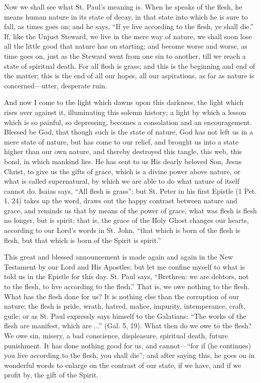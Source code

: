 Now we shall see what St. Paul's meaning is. When
he speaks of the flesh, he means human nature in its state of decay,
in that state into which he is sure to fall, as times goes on; and he
says, ``If ye live according to the flesh, ye shall die.'' If, like
the Unjust Steward, we live in the mere way of nature, we shall soon
lose all the little good that nature has on starting; and become worse
and worse, as time goes on, just as the Steward went from one sin to
another, till we reach a state of spiritual death. For all flesh is
grass; and this is the beginning and end of the matter; this is the
end of all our hopes, all our aspirations, as far as nature is
concerned—utter, desperate ruin.

And now I come to the light which dawns upon this
darkness, the light which rises over against it, illuminating this
solemn history; a light by which a lesson which is so painful, so
depressing, becomes a consolation and an encouragement. Blessed be
God, that though such is the state of nature, God has not left us in a
mere state of nature, but has come to our relief, and brought us into
a state higher than our own nature, and thereby destroyed this tangle,
this web, this bond, in which mankind lies. He has sent to us His
dearly beloved Son, Jesus Christ, to give us the gifts of grace, which
is a divine power above nature, or what is called supernatural, by
which we are able to do what nature of itself cannot do. Isaias
says, ``All flesh is grass''; but St. Peter in his first Epistle (1 Pet.
1, 24) takes up the word, draws out the happy contrast between nature
and grace, and reminds us that by means of the power of grace, what
was flesh is flesh no longer, but is spirit; that is, the grace of the
Holy Ghost changes our hearts, according to our Lord's words in St.
John, ``that which is born of the flesh is flesh, but that which is
born of the Spirit is spirit.''

This great and blessed announcement is made again
and again in the New Testament by our Lord and His Apostles; but let
me confine myself to what is told us in the Epistle for this day. St.
Paul says, ``Brethren: we are debtors, not to the flesh, to live
according to the flesh.'' That is, we owe nothing to the flesh. What
has the flesh done for us? It is nothing else than the corruption of
our nature; the flesh is pride, wrath, hatred, malice, impurity,
intemperance, craft, guile; or as St. Paul expressly says himself to
the Galatians: ``The works of the flesh are manifest, which are ...''
(Gal. 5, 19). What then do we owe to the flesh? We owe sin, misery, a
bad conscience, displeasure, spiritual death, future punishment. It
has done nothing good for us, and cannot—``for if (he continues) you
live according to the flesh, you shall die''; and after saying this, he
goes on in wonderful words to enlarge on the contrast of our state, if
we have, and if we profit by, the gift of the Spirit.

